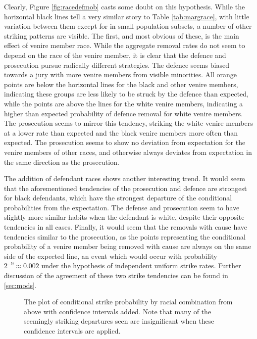 Clearly, Figure \ref{fig:racedefmob} casts some doubt on this hypothesis. While the horizontal black lines tell a very similar
story to Table \ref{tab:margrace}, with little variation between them except for in small population subsets, a number of other
striking patterns are visible. The first, and most obvious of these, is the main effect of venire member race. While the aggregate
removal rates do not seem to depend on the race of the venire member, it is clear that the defence and prosecution pursue
radically different strategies. The defence seems biased towards a jury with more venire members from visible minorities. All
orange points are below the horizontal lines for the black and other venire members, indicating these groups are less likely to be
struck by the defence than expected, while the points are above the lines for the white venire members, indicating a higher than
expected probability of defence removal for white venire members. The prosecution seems to mirror this tendency, striking the
white venire members at a lower rate than expected and the black venire members more often than expected. The prosecution seems to
show no deviation from expectation for the venire members of other races, and otherwise always deviates from expectation in the
same direction as the prosecution.

The addition of defendant races shows another interesting trend. It would seem that the aforementioned tendencies of the
prosecution and defence are strongest for black defendants, which have the strongest departure of the conditional probabilities
from the expectation. The defense and prosecution seem to have slightly more similar habits when the defendant is white, despite
their opposite tendencies in all cases. Finally, it would seem that the removals with cause have tendencies similar to the
prosecution, as the points representing the conditional probability of a venire member being removed with cause are always on the
same side of the expected line, an event which would occur with probability $2^{-9} \approx 0.002$ under the hypothesis of
independent uniform strike rates. Further discussion of the agreement of these two strike tendencies can be found in
\ref{sec:mods}.

\begin{figure}[h!]
  \centering
  \caption[Racial Combination and Strikes with Confidence
  Intervals (Sunsine)]{\footnotesize The plot of conditional strike probability by racial
    combination from above with confidence intervals added. Note that many of the seemingly striking departures seen are
    insignificant when these confidence intervals are applied.}
  \label{fig:racedefci}
\end{figure}

